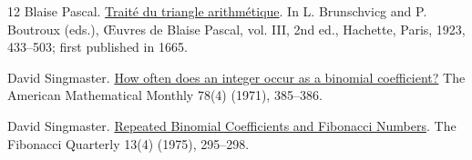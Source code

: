 \documentclass[11pt,a4paper]{article}
\begin{document}
\begin{thebibliography}{12}
Blaise Pascal. \href{https://fr.wikisource.org/wiki/Trait%C3%A9_du_triangle_arithm%C3%A9tique}{Trait\'e du triangle arithm\'etique}. In L. Brunschvicg and P. Boutroux (eds.), \OE{}uvres de Blaise Pascal, vol. III, 2nd ed., Hachette, Paris, 1923, 433--503; first published in 1665.

David Singmaster. \href{https://fermatslibrary.com/s/how-often-does-an-integer-occur-as-a-binomial-coefficient}{How often does an integer occur as a binomial coefficient?} The American Mathematical Monthly 78(4) (1971), 385--386.

David Singmaster. \href{https://www.fq.math.ca/Scanned/13-4/singmaster.pdf}{Repeated Binomial Coefficients and Fibonacci Numbers}. The Fibonacci Quarterly 13(4) (1975), 295--298.

\end{thebibliography}
\end{document}
